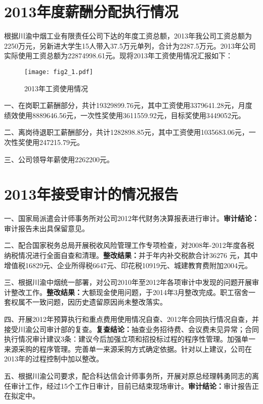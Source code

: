 


\section{2013年度薪酬分配执行情况}

\indent
根据川渝中烟工业有限责任公司下达的年度工资总额，2013年我公司工资总额为2250万元，另新进大学生15人带入37.5万元单列，合计为2287.5万元。2013年公司实际使用工资总额为22874998.61元。现将2013年工资使用情况汇报如下：

\begin{figure}[!htbp]
  \centering
  \texttt{[image: fig2\_1.pdf]}
  \caption{2013年工资使用情况}
  \label{figure2-1}
\end{figure}


一、在岗职工薪酬部分，共计19329899.76元，其中工资使用3379641.28元，月度绩效使用8889646.56元，一次性奖使用3611559.92元，目标奖使用3449052元。

二、离岗待退职工薪酬部分，共计1282898.85元，其中工资使用1035683.06元，一次性奖使用247215.79元。

三、公司领导年薪使用2262200元。







\section{2013年接受审计的情况报告}

一、国家局派遣会计师事务所对公司2012年代财务决算报表进行审计。\textbf{审计结论：}审计报告未出具保留意见。


二、配合国家税务总局开展税收风险管理工作专项检查，对2008年-2012年度各税纳税情况进行全面自查和清理。\textbf{整改结果：}并于年内补交税款合计36276 元，其中增值税16829元、企业所得税6647元、印花税10919元、城建教育费附加2004元。

三、根据川渝中烟统一部署，对公司2010年至2012年各项审计中发现的问题开展审计整改工作。\textbf{整改结果：}大额现金使用问题，于2014年3月整改完成。职工宿舍一套权属不一致问题，因历史遗留原因尚未整改落实。


四、开展2012年预算执行和重点费用使用情况自查、2012年合同执行情况自查，并接受川渝公司审计部的复查。\textbf{复查结论：}抽查业务招待费、会议费未见异常；合同执行情况审计建议3条：建议今后加强立项和招投标过程的程序性管理。加强单一来源采购的程序管理。完善单一来源采购方式确定依据。针对以上建议，公司在2013年的过程控制中加以整改。


五、根据川渝公司要求，配合科达信会计师事务所，开展对原总经理韩勇同志的离任审计工作，经过15个工作日审计，目前已结束现场审计。\textbf{审计结论：}审计报告正在拟定中。


